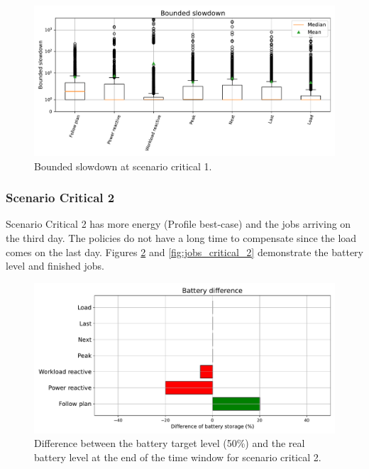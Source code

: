 \begin{figure}[!htb]
    \centering
    \includegraphics[scale=0.55]{Images/Compensations/slowdown_critical_1.pdf}
    \caption{Bounded slowdown at scenario critical 1.}
    \label{fig:slowdown_critical_1}
\end{figure}

\clearpage

\subsubsection{Scenario Critical 2}

Scenario Critical 2 has more energy (Profile best-case) and the jobs arriving on the third day. The policies do not have a long time to compensate since the load comes on the last day. Figures \ref{fig:SoC_critical_2} and \ref{fig:jobs_critical_2} demonstrate the battery level and finished jobs. 

\begin{figure}[!htb]
    \centering
    \includegraphics[scale=0.55]{Images/Compensations/battery_critical_2.pdf}
    \caption{Difference between the battery target level (50\%) and the real battery level at the end of the time window for scenario critical 2.}
    \label{fig:SoC_critical_2}
\end{figure}

